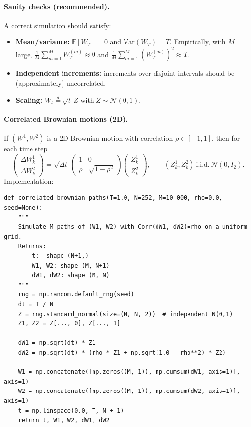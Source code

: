 \documentclass[11pt]{article}
\newcommand{\E}{\mathbb{E}}
\newcommand{\1}{\mathbf{1}}
\theoremstyle{plain}
\theoremstyle{definition}
\theoremstyle{remark}
\begin{document}
\paragraph{Sanity checks (recommended).}
A correct simulation should satisfy:
\begin{itemize}[leftmargin=1.6em, itemsep=0.25em]
\item \textbf{Mean/variance:} $\E[W_T]=0$ and $\mathrm{Var}(W_T)=T$.
Empirically, with $M$ large, $\frac1M\sum_{m=1}^M W_T^{(m)}\approx 0$
and $\frac1M\sum_{m=1}^M (W_T^{(m)})^2 \approx T$.
\item \textbf{Independent increments:} increments over disjoint intervals should be (approximately) uncorrelated.
\item \textbf{Scaling:} $W_t \stackrel{d}{=} \sqrt{t}\,Z$ with $Z\sim\mathcal N(0,1)$.
\end{itemize}

\paragraph{Correlated Brownian motions (2D).}
If $(W^1,W^2)$ is a 2D Brownian motion with correlation $\rho\in[-1,1]$, then for each time step
\[
\begin{pmatrix}\Delta W^1_k\\ \Delta W^2_k\end{pmatrix}
=
\sqrt{\Delta t}\,
\begin{pmatrix}
1 & 0\\
\rho & \sqrt{1-\rho^2}
\end{pmatrix}
\begin{pmatrix}Z^1_k\\ Z^2_k\end{pmatrix},
\qquad
(Z^1_k,Z^2_k)\ \text{i.i.d.}\ \mathcal N(0,I_2).
\]
Implementation:
\begin{verbatim}
def correlated_brownian_paths(T=1.0, N=252, M=10_000, rho=0.0, seed=None):
    """
    Simulate M paths of (W1, W2) with Corr(dW1, dW2)=rho on a uniform grid.
    Returns:
        t:  shape (N+1,)
        W1, W2: shape (M, N+1)
        dW1, dW2: shape (M, N)
    """
    rng = np.random.default_rng(seed)
    dt = T / N
    Z = rng.standard_normal(size=(M, N, 2))  # independent N(0,1)
    Z1, Z2 = Z[..., 0], Z[..., 1]

    dW1 = np.sqrt(dt) * Z1
    dW2 = np.sqrt(dt) * (rho * Z1 + np.sqrt(1.0 - rho**2) * Z2)

    W1 = np.concatenate([np.zeros((M, 1)), np.cumsum(dW1, axis=1)], axis=1)
    W2 = np.concatenate([np.zeros((M, 1)), np.cumsum(dW2, axis=1)], axis=1)
    t = np.linspace(0.0, T, N + 1)
    return t, W1, W2, dW1, dW2
\end{verbatim}
\end{document}

